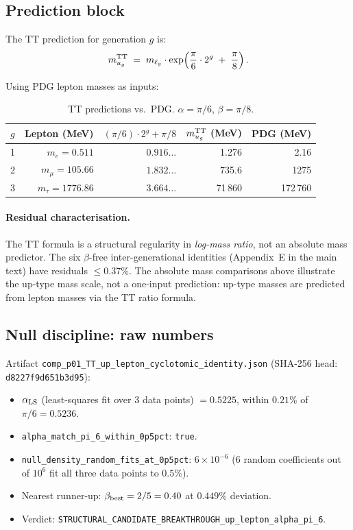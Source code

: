 \documentclass[11pt]{article}
\theoremstyle{remark}
\newcommand{\paren}[1]{\left(#1\right)}
\begin{document}
\subsection{Prediction block}
\label{sec:si_tt_block}

The TT prediction for generation $g$ is:
\[
  m_{u_g}^{\rm TT} \;=\; m_{\ell_g} \cdot \exp\!\paren{
    \frac{\pi}{6}\cdot 2^g \;+\; \frac{\pi}{8}
  }.
\]

Using PDG lepton masses as inputs:

\begin{table}[ht]
\centering
\caption{TT predictions vs.\ PDG.  $\alpha=\pi/6$, $\beta=\pi/8$.}
\label{tab:si_tt}
\begin{tabular}{lrrrr}
\toprule
$g$ & Lepton (MeV) & $(\pi/6)\cdot2^g + \pi/8$ & $m_{u_g}^{\rm TT}$ (MeV) & PDG (MeV) \\
\midrule
1 & $m_e = 0.511$ & $0.916\ldots$ & 1.276 & 2.16 \\
2 & $m_\mu = 105.66$ & $1.832\ldots$ & 735.6 & 1275 \\
3 & $m_\tau = 1776.86$ & $3.664\ldots$ & 71\,860 & 172\,760 \\
\bottomrule
\end{tabular}
\end{table}

\paragraph{Residual characterisation.}
The TT formula is a structural regularity in \emph{log-mass ratio}, not an
absolute mass predictor.  The six $\beta$-free inter-generational identities
(Appendix~E in the main text) have residuals $\leq 0.37\%$.
The absolute mass comparisons above illustrate the up-type mass scale,
not a one-input prediction: up-type masses are predicted from lepton masses
via the TT ratio formula.

\subsection{Null discipline: raw numbers}
\label{sec:si_tt_null}

{\sloppy Artifact \texttt{comp\_p01\_TT\_up\_lepton\_cyclotomic\_identity.json}
(SHA-256 head: \texttt{d8227f9d651b3d95}):\par}

\begin{itemize}
  \item $\alpha_{\rm LS}$ (least-squares fit over 3 data points) $= 0.5225$,
    within $0.21\%$ of $\pi/6 = 0.5236$.
  \item \texttt{alpha\_match\_pi\_6\_within\_0p5pct}: \texttt{true}.
  \item \texttt{null\_density\_random\_fits\_at\_0p5pct}: $6\times10^{-6}$
    (6 random coefficients out of $10^6$ fit all three data points to $0.5\%$).
  \item Nearest runner-up: $\beta_{\rm best} = 2/5 = 0.40$ at $0.449\%$ deviation.
  \item Verdict: \texttt{STRUCTURAL\_CANDIDATE\_BREAKTHROUGH\_up\_lepton\_alpha\_pi\_6}.
\end{itemize}
\end{document}
